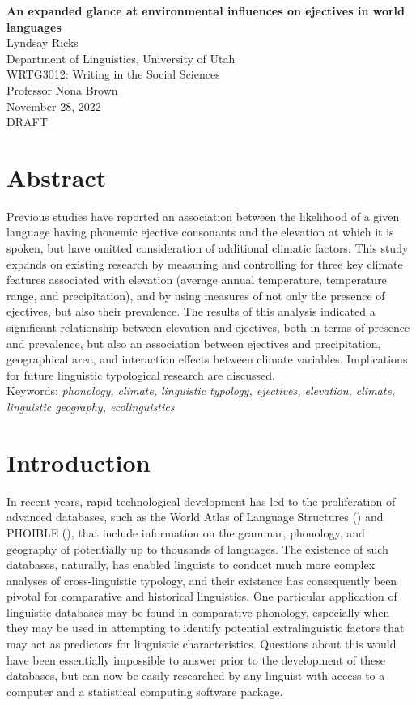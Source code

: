 \documentclass{article}
\begin{document}
\begin{titlepage}
	\centering
	\vspace*{0.2\textheight}
	\textbf{An expanded glance at environmental influences on ejectives in world languages}\\
	Lyndsay Ricks\\
	Department of Linguistics, University of Utah\\
	WRTG3012: Writing in the Social Sciences\\
	Professor Nona Brown\\
	November 28, 2022\\
	DRAFT
\end{titlepage}
\section*{Abstract}

Previous studies have reported an association between the likelihood of a given language having phonemic ejective consonants and the elevation at which it is spoken, but have omitted consideration of additional climatic factors. This study expands on existing research by measuring and controlling for three key climate features associated with elevation (average annual temperature, temperature range, and precipitation), and by using measures of not only the presence of ejectives, but also their prevalence. The results of this analysis indicated a significant relationship between elevation and ejectives, both in terms of presence and prevalence, but also an association between ejectives and precipitation, geographical area, and interaction effects between climate variables. Implications for future linguistic typological research are discussed. \\

{\parindent0pt Keywords: \emph{phonology, climate, linguistic typology, ejectives, elevation, climate, linguistic geography, ecolinguistics}}

\pagebreak

\section{Introduction}
In recent years, rapid technological development has led to the proliferation of advanced databases, such as the World Atlas of Language Structures (\cite{wals}) and PHOIBLE (\cite{phoible}), that include information on the grammar, phonology, and geography of potentially up to thousands of languages. The existence of such databases, naturally, has enabled linguists to conduct much more complex analyses of cross-linguistic typology, and their existence has consequently been pivotal for comparative and historical linguistics. One particular application of linguistic databases may be found in comparative phonology, especially when they may be used in attempting to identify potential extralinguistic factors that may act as predictors for linguistic characteristics. Questions about this would have been essentially impossible to answer prior to the development of these databases, but can now be easily researched by any linguist with access to a computer and a statistical computing software package. 
\end{document}

